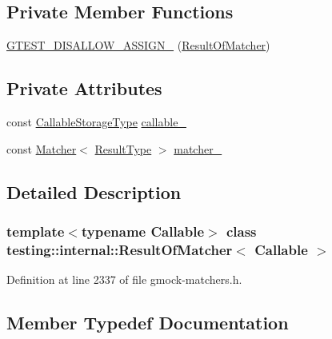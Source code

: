 \subsection*{Private Member Functions}
\begin{DoxyCompactItemize}
\item 
\hyperlink{classtesting_1_1internal_1_1ResultOfMatcher_aad5df085fb0d9648eb8eaaf9b53b14e8}{G\+T\+E\+S\+T\+\_\+\+D\+I\+S\+A\+L\+L\+O\+W\+\_\+\+A\+S\+S\+I\+G\+N\+\_\+} (\hyperlink{classtesting_1_1internal_1_1ResultOfMatcher}{Result\+Of\+Matcher})
\end{DoxyCompactItemize}
\subsection*{Private Attributes}
\begin{DoxyCompactItemize}
\item 
const \hyperlink{classtesting_1_1internal_1_1ResultOfMatcher_a6f7f7d80162bebdf73681d6a3aa92c7d}{Callable\+Storage\+Type} \hyperlink{classtesting_1_1internal_1_1ResultOfMatcher_a0da13870ff65546571ed39ec798242aa}{callable\+\_\+}
\item 
const \hyperlink{classtesting_1_1Matcher}{Matcher}$<$ \hyperlink{classtesting_1_1internal_1_1ResultOfMatcher_aa9db2267792fcae2cfa3f57683f4e048}{Result\+Type} $>$ \hyperlink{classtesting_1_1internal_1_1ResultOfMatcher_ad74ae1b72a5f2045ea1e557e7c643887}{matcher\+\_\+}
\end{DoxyCompactItemize}


\subsection{Detailed Description}
\subsubsection*{template$<$typename Callable$>$\newline
class testing\+::internal\+::\+Result\+Of\+Matcher$<$ Callable $>$}



Definition at line 2337 of file gmock-\/matchers.\+h.



\subsection{Member Typedef Documentation}
\mbox{\label{classtesting_1_1internal_1_1ResultOfMatcher_a6f7f7d80162bebdf73681d6a3aa92c7d}} 

